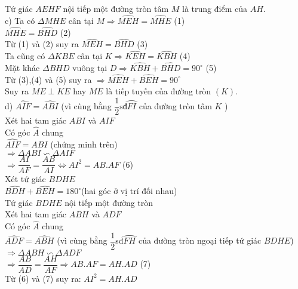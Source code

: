 \begin{ex}
{		Tứ giác $AEHF$ nội tiếp một đường tròn tâm $M$ là trung điểm của $AH$.\\
		c) Ta có $\Delta MHE$ cân tại $M\Rightarrow \widehat{MEH}=\widehat{MHE}$ (1)\\
		$\widehat{MHE}=\widehat{BHD}$ (2)\\
		Từ (1) và (2) suy ra $\widehat{MEH}=\widehat{BHD}$	(3)\\
		Ta cũng có $\Delta KBE$ cân tại $K\Rightarrow \widehat{KEH}= \widehat{KBH}$ (4)\\
		Mặt khác $\Delta BHD$ vuông tại $D\Rightarrow \widehat{KBH}+\widehat{BHD}=90^\circ $ (5)\\
		Từ (3),(4) và (5) suy ra $\Rightarrow \widehat{MEH}+\widehat{BEH}=90^\circ $\\
		Suy ra $ME \perp KE$ hay $ME$ là tiếp tuyến của đường tròn $\left( K \right)$.\\
		d) $\widehat{AIF}= \widehat{ABI}$ (vì cùng bằng $\dfrac{1}{2} \text{sđ} \wideparen{FI}$ của đường tròn tâm $K$ )\\
		Xét hai tam giác $ABI$ và $AIF$ \\
		Có góc $\widehat{A}$ chung\\
		$\widehat{AIF}=\widehat{ABI}$ (chứng minh trên)\\
		$\Rightarrow \Delta ABI \backsim \Delta AIF$\\
		$\Rightarrow \dfrac{AI}{AF}=\dfrac{AB}{AI} \Leftrightarrow AI^2=AB.AF$ 	(6)\\
		Xét tứ giác $BDHE$\\
		$\widehat{BDH}+\widehat{BEH}=180^\circ $(hai góc ở vị trí đối nhau)\\
		Tứ giác $BDHE$ nội tiếp một đường tròn\\
		Xét hai tam giác $ABH$ và $ADF$ \\
		Có góc $\widehat{A}$ chung\\
		$\widehat{ADF}=\widehat{ABH}$ (vì cùng bằng $\dfrac{1}{2}$sđ$\wideparen{FH}$ của đường tròn ngoại tiếp tứ giác $BDHE$)\\
		$\Rightarrow \Delta ABH \backsim \Delta ADF$\\
		$\Rightarrow \dfrac{AB}{AD}=\dfrac{AH}{AF} \Rightarrow AB.AF=AH.AD$ (7)\\
		Từ (6) và (7) suy ra: $AI^2=AH.AD$
}
\end{ex}
